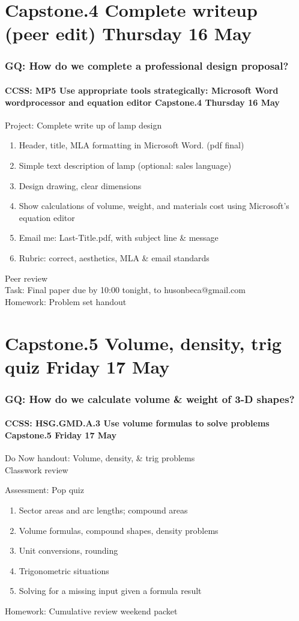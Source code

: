\documentclass{beamer}
\begin{document}
\section{Capstone.4 Complete writeup (peer edit) Thursday 16 May}
  \frame
  {
    \frametitle{GQ: How do we complete a professional design proposal?}
    \framesubtitle{CCSS: MP5 Use appropriate tools strategically: Microsoft Word wordprocessor and equation editor \hfill \alert{Capstone.4 Thursday 16 May}}

    \begin{block}{Project: Complete write up of lamp design}
      \begin{enumerate}
        \item Header, title, MLA formatting in Microsoft Word. (pdf final)
        \item Simple text description of lamp (optional: sales language)
        \item Design drawing, clear dimensions
        \item Show calculations of volume, weight, and materials cost using Microsoft's equation editor
        \item Email me: Last-Title.pdf, with subject line \& message
        \item Rubric: correct, aesthetics, MLA \& email standards
      \end{enumerate}
    \end{block}
    Peer review\\
    Task: Final paper due by 10:00 tonight, to husonbeca@gmail.com\\
    Homework: Problem set handout
  }

\section{Capstone.5 Volume, density, trig quiz Friday 17 May}
  \frame
  {
    \frametitle{GQ: How do we calculate volume \& weight of 3-D shapes?}
    \framesubtitle{CCSS: HSG.GMD.A.3 Use volume formulas to solve problems \hfill \alert{Capstone.5 Friday 17 May}}

    Do Now handout: Volume, density, \& trig problems\\
    Classwork review
    \begin{block}{Assessment: Pop quiz}
      \begin{enumerate}
        \item Sector areas and arc lengths; compound areas
        \item Volume formulas, compound shapes, density problems
        \item Unit conversions, rounding
        \item Trigonometric situations
        \item Solving for a missing input given a formula result
    \end{enumerate}
    \end{block}
    Homework: Cumulative review weekend packet
  }
\end{document}
